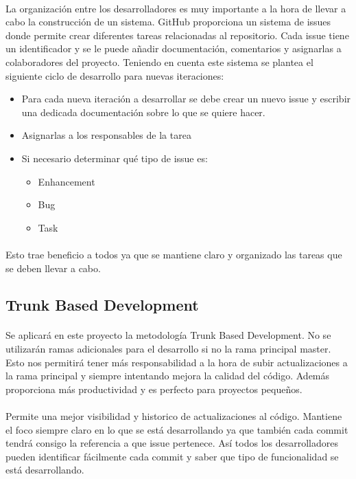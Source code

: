 \paragraph{}
La organización entre los desarrolladores es muy importante a la hora de llevar a cabo la construcción de un sistema. GitHub proporciona un sistema de issues donde permite crear diferentes tareas relacionadas al repositorio. Cada issue tiene un identificador y se le puede añadir documentación, comentarios y asignarlas a colaboradores del proyecto. Teniendo en cuenta este sistema se plantea el siguiente ciclo de desarrollo para nuevas iteraciones:
\begin{itemize}
\item
  Para cada nueva iteración a desarrollar se debe crear un nuevo issue y escribir una dedicada documentación sobre lo que se quiere hacer.
\item
  Asignarlas a los responsables de la tarea
\item
  Si necesario determinar qué tipo de issue es:
  \begin{itemize}
  \item
    Enhancement
  \item
    Bug
  \item
    Task
  \end{itemize}
\end{itemize}

\paragraph{}
Esto trae beneficio a todos ya que se mantiene claro y organizado las tareas que se deben llevar a cabo.

\subsection{Trunk Based Development}
\paragraph{}
Se aplicará en este proyecto la metodología Trunk Based Development. No se utilizarán ramas adicionales para el desarrollo si no la rama principal master. Esto nos permitirá tener más responsabilidad a la hora de subir actualizaciones a la rama principal y siempre intentando mejora la calidad del código. Además proporciona más productividad y es perfecto para proyectos pequeños. 

\paragraph{}
Permite una mejor visibilidad y historico de actualizaciones al código. Mantiene el foco siempre claro en lo que se está desarrollando ya que también cada commit tendrá consigo la referencia a que issue pertenece. Así todos los desarrolladores pueden identificar fácilmente cada commit y saber que tipo de funcionalidad se está desarrollando. 

